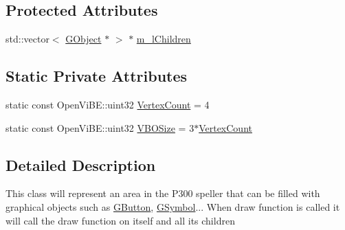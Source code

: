 \subsection*{Protected Attributes}
\begin{DoxyCompactItemize}
\item 
std::vector$<$ \hyperlink{classOpenViBEApplications_1_1GObject}{GObject} $\ast$ $>$ $\ast$ \hyperlink{classOpenViBEApplications_1_1GContainer_a17dac34cda13e1ab45a7b88b3f3e19f9}{m\_\-lChildren}
\end{DoxyCompactItemize}
\subsection*{Static Private Attributes}
\begin{DoxyCompactItemize}
\item 
static const OpenViBE::uint32 \hyperlink{classOpenViBEApplications_1_1GContainer_aa19161724939d76588a0fcb19761e6f1}{VertexCount} = 4
\item 
static const OpenViBE::uint32 \hyperlink{classOpenViBEApplications_1_1GContainer_a86ba0dc62cf6c379af8cef58b3972d93}{VBOSize} = 3$\ast$\hyperlink{classOpenViBEApplications_1_1GContainer_aa19161724939d76588a0fcb19761e6f1}{VertexCount}
\end{DoxyCompactItemize}


\subsection{Detailed Description}
This class will represent an area in the P300 speller that can be filled with graphical objects such as \hyperlink{classOpenViBEApplications_1_1GButton}{GButton}, \hyperlink{classOpenViBEApplications_1_1GSymbol}{GSymbol}... When draw function is called it will call the draw function on itself and all its children 

